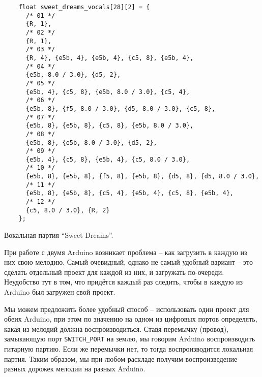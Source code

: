 \documentclass[../sparc.tex]{subfiles}
\begin{document}
\begin{listing}[!h]
  \begin{verbatim}
    float sweet_dreams_vocals[28][2] = {
      /* 01 */
      {R, 1},
      /* 02 */
      {R, 1},
      /* 03 */
      {R, 4}, {e5b, 4}, {e5b, 4}, {c5, 8}, {e5b, 4},
      /* 04 */
      {e5b, 8.0 / 3.0}, {d5, 2},
      /* 05 */
      {e5b, 4}, {c5, 8}, {e5b, 8.0 / 3.0}, {c5, 4},
      /* 06 */
      {e5b, 8}, {f5, 8.0 / 3.0}, {d5, 8.0 / 3.0}, {c5, 8},
      /* 07 */
      {e5b, 8}, {e5b, 8}, {c5, 8}, {e5b, 8.0 / 3.0},
      /* 08 */
      {e5b, 8}, {e5b, 8.0 / 3.0}, {d5, 2},
      /* 09 */
      {e5b, 4}, {c5, 8}, {e5b, 4}, {c5, 8.0 / 3.0},
      /* 10 */
      {e5b, 8}, {e5b, 8}, {f5, 8}, {e5b, 8}, {d5, 8}, {d5, 8.0 / 3.0},
      /* 11 */
      {e5b, 8}, {e5b, 8}, {c5, 4}, {e5b, 4}, {c5, 8}, {e5b, 4},
      /* 12 */
      {c5, 8.0 / 3.0}, {R, 2}
    };
  \end{verbatim}
  \label{listing:music-band-sweet-dreams-2}
  \caption{Вокальная партия ``Sweet Dreams''.}
\end{listing}

При работе с двумя Arduino возникает проблема -- как загрузить в каждую из них
свою мелодию.  Самый очевидный, однако не самый удобный вариант -- это сделать
отдельный проект для каждой из них, и загружать по-очереди.  Неудобство тут в
том, что придётся каждый раз следить, чтобы в каждую из Arduino был загружен
свой проект.

Мы можем предложить более удобный способ -- использовать один проект для обеих
Arduino, при этом по значению на одном из цифровых портов определять, какая из
мелодий должна воспроизводиться.  Ставя перемычку (провод), замыкающую порт
\texttt{SWITCH\_PORT} на землю, мы говорим Arduino воспроизводить гитарную
партию.  Если же перемычки нет, то тогда воспроизводится локальная партия.
Таким образом, мы при любом раскладе получим воспроизведение разных дорожек
мелодии на разных Arduino.
\end{document}
